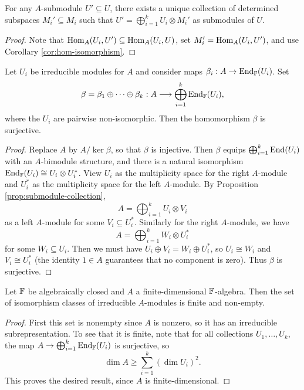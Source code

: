 \begin{prop}\label{prop:submodule-collection}
  For any $A$-submodule $U' \subseteq U$,
  there exists a unique collection of
  determined subspaces $M_i' \subseteq M_i$
  such that
  $U' = \bigoplus_{i = 1}^k U_i \otimes M_i'$
  as submodules of $U$.
\end{prop}

\begin{proof}
  Note that $\operatorname{Hom}_A(U_i, U') \subseteq \operatorname{Hom}_A(U_i, U)$,
  set $M_i' = \operatorname{Hom}_A(U_i, U')$,
  and use Corollary \ref{cor:hom-isomorphism}.
\end{proof}

\begin{theorem}
  Let $U_i$ be irreducible modules for
  $A$ and consider maps
  $\beta_i : A \to \operatorname{End}_{\mathbb{F}}(U_i)$. Set
  \[
    \beta = \beta_1 \oplus \cdots \oplus \beta_k : A \longrightarrow \bigoplus_{i = 1}^k \operatorname{End}_{\mathbb{F}}(U_i),
  \]
  where the $U_i$ are pairwise
  non-isomorphic. Then the
  homomorphism $\beta$ is surjective.
\end{theorem}

\begin{proof}
  Replace $A$ by $A /{\ker \beta}$, so that
  $\beta$ is injective. Then
  $\beta$ equips $\bigoplus_{i = 1}^k \operatorname{End}(U_i)$
  with an $A$-bimodule structure, and
  there is a natural isomorphism
  $\operatorname{End}_{\mathbb{F}}(U_i) \cong U_i \otimes U_i^*$.
  View $U_i$ as the multiplicity space
  for the right $A$-module and $U_i^*$ as
  the multiplicity space for the left
  $A$-module. By Proposition
  \ref{prop:submodule-collection},
  \[
    A = \bigoplus_{i = 1}^k U_i \otimes V_i
  \]
  as a left $A$-module for some
  $V_i \subseteq U_i^*$. Similarly for
  the right $A$-module, we have
  \[
    A = \bigoplus_{i = 1}^k W_i \otimes U_i^*
  \]
  for some $W_i \subseteq U_i$.
  Then we must have
  $U_i \oplus V_i = W_i \oplus U_i^*$,
  so $U_i \cong W_i$ and $V_i \cong U_i^*$
  (the identity $1 \in A$ guarantees that
  no component is zero). Thus
  $\beta$ is surjective.
\end{proof}

\begin{corollary}
  Let $\mathbb{F}$ be algebraically closed and
  $A$ a finite-dimensional $\mathbb{F}$-algebra.
  Then the set of isomorphism classes of
  irreducible $A$-modules is finite
  and non-empty.
\end{corollary}

\begin{proof}
  First this set is nonempty since $A$ is
  nonzero, so it has an
  irreducible subrepresentation.
  To see that it is finite,
  note that for all collections
  $U_1, \dots, U_k$, the map
  $A \to \bigoplus_{i = 1}^k \operatorname{End}_{\mathbb{F}}(U_i)$
  is surjective, so
  \[
    \dim A \ge \sum_{i = 1}^k (\dim U_i)^2.
  \]
  This proves the desired result, since
  $A$ is finite-dimensional.
\end{proof}

